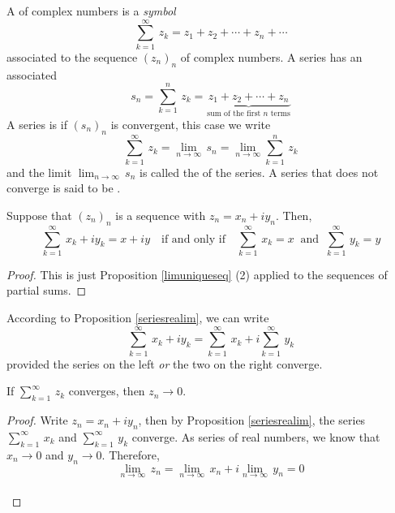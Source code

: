 \vspace*{1em}

\begin{definition}[Series]
A  of complex numbers is a \emph{symbol}
\[\sum_{k = 1}^\infty\,z_k = z_1 + z_2 + \cdots + z_n + \cdots\]
associated to the sequence $(z_n)_n$ of complex numbers. A series has an associated  
\[s_n = \sum_{k=1}^n\,z_k = \underbrace{\,z_1 + z_2 + \cdots + z_n\,}_{\text{sum of the first $n$ terms}}\]
A series is  if $(s_n)_n$ is convergent, this case we write
\[\sum_{k = 1}^\infty\,z_k = \lim_{n \to \infty}\,s_n = \lim_{n \to \infty}\sum_{k=1}^n\,z_k\]
and the limit $\lim_{n \to \infty}\, s_n$ is called the  of the series. A series that does not converge is said to be .
\end{definition}

\vspace*{1em}

\begin{proposition}\label{seriesrealim}
Suppose that $(z_n)_n$ is a sequence with $z_n = x_n + iy_n$. Then,
\[\sum_{k=1}^\infty \,x_k + iy_k = x + iy \quad \text{if and only if} \quad \sum_{k=1}^\infty \,x_k = x\ \text{ and }\ \sum_{k=1}^\infty \,y_k = y\]
\end{proposition}
\begin{proof}
This is just Proposition \ref{limuniqueseq} (2) applied to the sequences of partial sums.
\end{proof}

\vspace*{1em}

\begin{remark}
According to Proposition \ref{seriesrealim}, we can write
\[\sum_{k=1}^\infty \,x_k + iy_k = \sum_{k=1}^\infty \,x_k + i\sum_{k=1}^\infty \,y_k\]
provided the series on the left \emph{or} the two on the right converge. 
\end{remark}


\begin{proposition}\label{tailzero}
If $\sum_{k=1}^\infty \,z_k$ converges, then $z_n \to 0$.
\end{proposition}
\begin{proof}
Write $z_n = x_n + iy_n$, then by Proposition \ref{seriesrealim}, the series $\sum_{k=1}^\infty \,x_k$ and $\sum_{k=1}^\infty \,y_k$ converge. As series of real numbers, we know that $x_n \to 0$ and $y_n \to 0$. Therefore,
\[\lim_{n \to \infty}\,z_n = \lim_{n \to \infty}\,x_n + i\lim_{n \to \infty}\,y_n = 0\]\\[-2em]
\end{proof}

